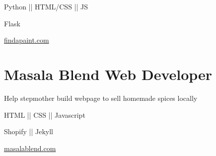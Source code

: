 \vspace{-1.5ex}
{
    \vspace{-0.8ex}
    \color{cyan}\small
    {Python || HTML/CSS || JS}
}

{
    \vspace{-2.5ex}\hspace{1.5in}
    \color{cyan}\small
    {Flask}
}

{
    \vspace{-2.5ex}\hspace{3in}
    \color{blue}\small
    {\href{https://www.findapaint.com}{findapaint.com}{}}
}

\vspace{0.5ex}


\section{
    \textbf{Masala Blend} \newline
    Web Developer
}{}


\vspace{-2.5ex}

\begin{detail}
    \BulletItem
    Help stepmother build webpage to sell homemade spices locally
\end{detail}

\begin{subtitle}
    \vspace{-5ex}
    {{}} 
\end{subtitle}

\vspace{-1.5ex}
{
    \vspace{-0.8ex}
    \color{cyan}\small
    {HTML || CSS || Javascript}
}

{
    \vspace{-2.5ex}\hspace{1.5in}
    \color{cyan}\small
    {Shopify || Jekyll}
}

{
    \vspace{-2.5ex}\hspace{3in}
    \color{blue}\small
    {\href{https://masalablend.com}{masalablend.com}{}}
}

\vspace{0.5ex}


